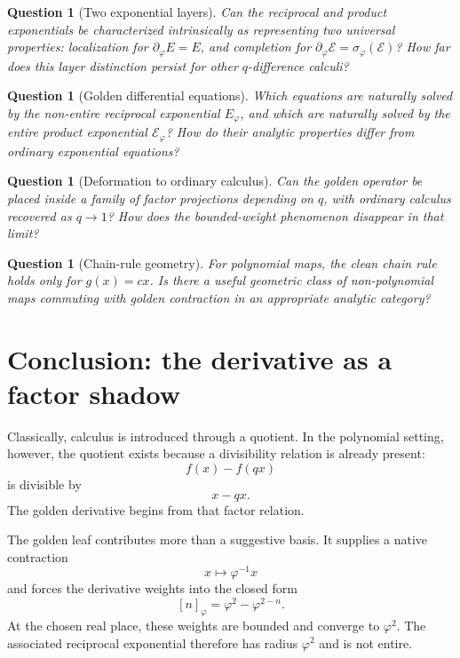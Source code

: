 \documentclass[11pt]{article}
\newtheorem{question}[definition]{Question}
\newcommand{\sig}{\sigma}
\newcommand{\ph}{\varphi}
\newcommand{\dd}{\partial_{\ph}}
\newcommand{\Eph}{E_{\ph}}
\newcommand{\Etw}{\mathcal E_{\ph}}
\begin{document}
\begin{question}[Two exponential layers]
Can the reciprocal and product exponentials be characterized intrinsically as representing two universal properties: localization for $\dd E=E$, and completion for $\dd\mathcal E=\sig_{\ph}(\mathcal E)$?  How far does this layer distinction persist for other $q$-difference calculi?
\end{question}

\begin{question}[Golden differential equations]
Which equations are naturally solved by the non-entire reciprocal exponential $\Eph$, and which are naturally solved by the entire product exponential $\Etw$?  How do their analytic properties differ from ordinary exponential equations?
\end{question}

\begin{question}[Deformation to ordinary calculus]
Can the golden operator be placed inside a family of factor projections depending on $q$, with ordinary calculus recovered as $q\to1$?  How does the bounded-weight phenomenon disappear in that limit?
\end{question}

\begin{question}[Chain-rule geometry]
For polynomial maps, the clean chain rule holds only for $g(x)=cx$.  Is there a useful geometric class of non-polynomial maps commuting with golden contraction in an appropriate analytic category?
\end{question}

\section{Conclusion: the derivative as a factor shadow}

Classically, calculus is introduced through a quotient.  In the polynomial setting, however, the quotient exists because a divisibility relation is already present:
\[
    f(x)-f(qx)
\]
is divisible by
\[
    x-qx.
\]
The golden derivative begins from that factor relation.

The golden leaf contributes more than a suggestive basis.  It supplies a native contraction
\[
    x\mapsto\ph^{-1}x
\]
and forces the derivative weights into the closed form
\[
    [n]_{\ph}=\ph^2-\ph^{2-n}.
\]
At the chosen real place, these weights are bounded and converge to $\ph^2$.  The associated reciprocal exponential therefore has radius $\ph^2$ and is not entire.
\end{document}
